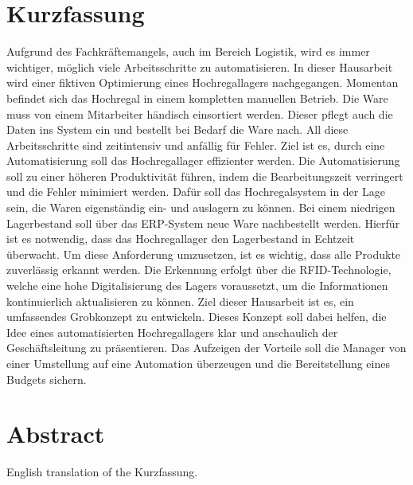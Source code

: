 \chapter*{Kurzfassung} %

Aufgrund des Fachkräftemangels, auch im Bereich Logistik, wird es immer wichtiger, möglich viele Arbeitsschritte zu automatisieren.
In dieser Hausarbeit wird einer fiktiven Optimierung eines Hochregallagers nachgegangen. 
Momentan befindet sich das Hochregal in einem kompletten manuellen Betrieb. Die Ware muss von einem Mitarbeiter händisch einsortiert werden. Dieser pflegt auch die Daten ins System ein und bestellt bei Bedarf die Ware nach.
All diese Arbeitsschritte sind zeitintensiv und anfällig für Fehler.
Ziel ist es, durch eine Automatisierung soll das Hochregallager effizienter werden. Die Automatisierung soll zu einer höheren Produktivität führen, indem die Bearbeitungszeit verringert und die Fehler minimiert werden. Dafür soll das Hochregalsystem in der Lage sein, die Waren eigenständig ein- und auslagern zu können. 
Bei einem niedrigen Lagerbestand soll über das ERP-System neue Ware nachbestellt werden. Hierfür ist es notwendig, dass das Hochregallager den Lagerbestand in Echtzeit überwacht. Um diese Anforderung umzusetzen, ist es wichtig, dass alle Produkte zuverlässig erkannt werden. Die Erkennung erfolgt über die RFID-Technologie, welche eine hohe Digitalisierung des Lagers voraussetzt, um die Informationen kontinuierlich aktualisieren zu können.
Ziel dieser Hausarbeit ist es, ein umfassendes Grobkonzept zu entwickeln. Dieses Konzept soll dabei helfen, die Idee eines automatisierten Hochregallagers klar und anschaulich der Geschäftsleitung zu präsentieren. 
Das Aufzeigen der Vorteile soll die Manager von einer Umstellung auf eine Automation überzeugen und die Bereitstellung eines Budgets sichern.



\chapter*{Abstract} %

English translation of the \glqq Kurzfassung\grqq.

\clearpage